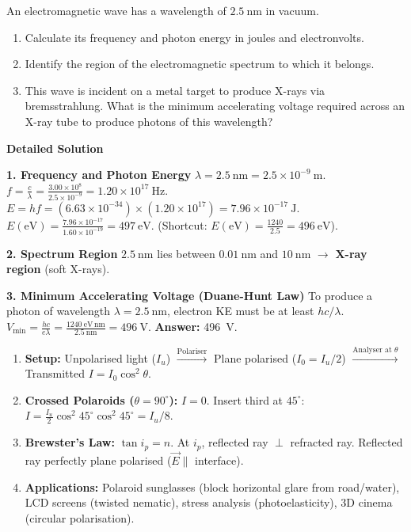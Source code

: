 \documentclass[11pt]{article}
\begin{document}
\begin{exoresolu}
An electromagnetic wave has a wavelength of $2.5\ \mathrm{nm}$ in vacuum.
\begin{enumerate}
\item Calculate its frequency and photon energy in joules and electronvolts.
\item Identify the region of the electromagnetic spectrum to which it belongs.
\item This wave is incident on a metal target to produce X-rays via bremsstrahlung. What is the minimum accelerating voltage required across an X-ray tube to produce photons of this wavelength?
\end{enumerate}
\tcblower
\textbf{Detailed Solution}

\textbf{1. Frequency and Photon Energy}
$\lambda = 2.5\ \mathrm{nm} = 2.5 \times 10^{-9}\ \mathrm{m}$.
$f = \frac{c}{\lambda} = \frac{3.00 \times 10^8}{2.5 \times 10^{-9}} = 1.20 \times 10^{17}\ \mathrm{Hz}$.
$E = hf = (6.63 \times 10^{-34}) \times (1.20 \times 10^{17}) = 7.96 \times 10^{-17}\ \mathrm{J}$.
$E(\mathrm{eV}) = \frac{7.96 \times 10^{-17}}{1.60 \times 10^{-19}} = 497\ \mathrm{eV}$.
(Shortcut: $E(\mathrm{eV}) = \frac{1240}{2.5} = 496\ \mathrm{eV}$).

\textbf{2. Spectrum Region}
$2.5\ \mathrm{nm}$ lies between $0.01\ \mathrm{nm}$ and $10\ \mathrm{nm}$ $\rightarrow$ \textbf{X-ray region} (soft X-rays).

\textbf{3. Minimum Accelerating Voltage (Duane-Hunt Law)}
To produce a photon of wavelength $\lambda = 2.5\ \mathrm{nm}$, electron KE must be at least $hc/\lambda$.
$V_{\min} = \frac{hc}{e\lambda} = \frac{1240\ \mathrm{eV\,nm}}{2.5\ \mathrm{nm}} = 496\ \mathrm{V}$.
\textbf{Answer:} \SI{496}{V}.
\end{exoresolu}

\begin{methode}
\begin{enumerate}
\item \textbf{Setup:} Unpolarised light ($I_u$) $\xrightarrow{\text{Polariser}}$ Plane polarised ($I_0 = I_u/2$) $\xrightarrow{\text{Analyser at }\theta}$ Transmitted $I = I_0\cos^2\theta$.
\item \textbf{Crossed Polaroids ($\theta=90^\circ$):} $I=0$. Insert third at $45^\circ$: $I = \frac{I_u}{2}\cos^2 45^\circ \cos^2 45^\circ = I_u/8$.
\item \textbf{Brewster's Law:} $\tan i_p = n$. At $i_p$, reflected ray $\perp$ refracted ray. Reflected ray perfectly plane polarised ($\vec{E} \parallel$ interface).
\item \textbf{Applications:} Polaroid sunglasses (block horizontal glare from road/water), LCD screens (twisted nematic), stress analysis (photoelasticity), 3D cinema (circular polarisation).
\end{enumerate}
\end{methode}
\end{document}
